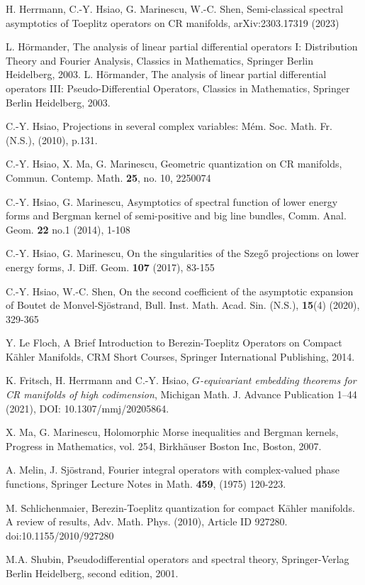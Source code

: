 \documentclass{article}
\begin{document}
\begin{thebibliography}{}
H. Herrmann, C.-Y. Hsiao, G. Marinescu, W.-C. Shen, Semi-classical spectral asymptotics of Toeplitz operators on CR manifolds, arXiv:2303.17319 (2023)

L. H\"{o}rmander, The analysis of linear partial differential operators I: Distribution Theory and Fourier Analysis, Classics in Mathematics, Springer Berlin Heidelberg, 2003.
%
L. H\"{o}rmander, The analysis of linear partial differential operators III: Pseudo-Differential Operators, Classics in Mathematics, Springer Berlin Heidelberg, 2003.

C.-Y. Hsiao, Projections in several complex variables: M\'{e}m. Soc. Math. Fr. (N.S.), (2010), p.131.

C.-Y. Hsiao, X. Ma, G. Marinescu, Geometric quantization on CR manifolds, Commun. Contemp. Math. {\bf 25}, no. 10, 2250074

C.-Y. Hsiao, G. Marinescu, Asymptotics of spectral function of lower energy forms and Bergman kernel of semi-positive and big line bundles, Comm. Anal. Geom. {\bf 22} no.1 (2014), 1-108

C.-Y. Hsiao, G. Marinescu, On the singularities of the Szeg\H{o} projections on lower energy forms, J. Diff. Geom. {\bf 107} (2017), 83-155

C.-Y. Hsiao, W.-C. Shen, On the second coefficient of the asymptotic expansion of Boutet de Monvel-Sj\"{o}strand, Bull. Inst. Math. Acad. Sin. (N.S.), {\bf 15}(4) (2020), 329-365

Y. Le Floch, A Brief Introduction to Berezin-Toeplitz Operators on Compact K\"{a}hler Manifolds, CRM Short Courses, Springer International Publishing, 2014.

 K. Fritsch, H. Herrmann and C.-Y. Hsiao, {\em $G$-equivariant embedding theorems for CR manifolds of high codimension}, 
		Michigan Math. J. Advance Publication 1--44 (2021), DOI: 10.1307/mmj/20205864.

X. Ma, G. Marinescu, Holomorphic Morse inequalities and Bergman kernels, Progress in Mathematics, vol. 254, Birkh\"{a}user Boston Inc, Boston, 2007.

A. Melin, J. Sj\"{o}strand, Fourier integral operators with complex-valued phase functions, Springer Lecture Notes in Math. {\bf 459}, (1975) 120-223.

M. Schlichenmaier, Berezin-Toeplitz quantization for compact K\"{a}hler manifolds. A review of results, Adv. Math. Phys. (2010), Article ID 927280. doi:10.1155/2010/927280

M.A. Shubin, Pseudodifferential operators and spectral theory, Springer-Verlag Berlin Heidelberg, second edition, 2001.

\end{thebibliography}
%
\end{document}
